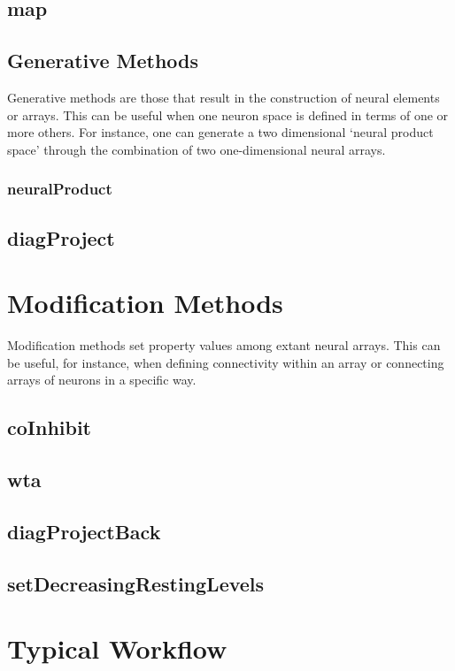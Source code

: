 \documentclass[phd, 12pt, doublespace, online]{fauthesis}
\begin{document}
\subsection{map}


\subsection{Generative Methods}

Generative methods are those that result in the construction of neural elements or arrays. This can be useful when one neuron space is defined in terms of one or more others. For instance, one can generate a two dimensional `neural product space' through the combination of two one-dimensional neural arrays. 

\subsubsection{neuralProduct}
\subsection{diagProject}

\section{Modification Methods}

Modification methods set property values among extant neural arrays. This can be useful, for instance, when defining connectivity within an array or connecting arrays of neurons in a specific way. 

\subsection{coInhibit}
\subsection{wta}
\subsection{diagProjectBack}
\subsection{setDecreasingRestingLevels}

\section{Typical Workflow}
\end{document}
